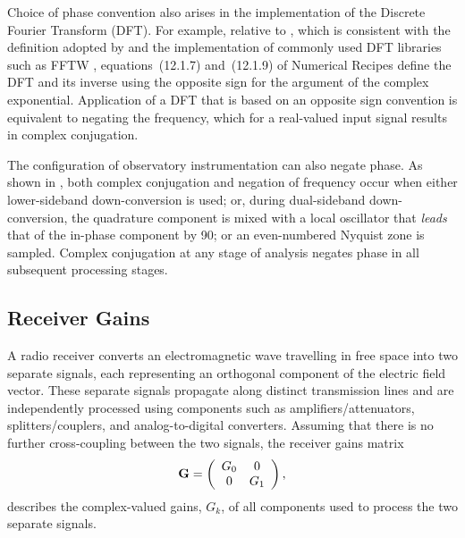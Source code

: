 Choice of phase convention also arises in the implementation of the Discrete Fourier Transform (DFT).
%
For example, relative to , which is consistent with the definition adopted by \citet{bra65} and the implementation of commonly used DFT libraries such as FFTW \citep{fj05},
%
equations~(12.1.7) and~(12.1.9) of Numerical Recipes \citep{pftv86} define the DFT and its inverse using the opposite sign for the argument of the complex exponential.
%
Application of a DFT that is based on an opposite sign convention is equivalent to negating the frequency, which for a real-valued input signal results in complex conjugation.

The configuration of observatory instrumentation can also negate phase.  
As shown in , both complex conjugation and 
negation of frequency occur when either
  lower-sideband down-conversion is used; or,
  during dual-sideband down-conversion, the quadrature component is mixed with a local oscillator that \emph{leads} that of the in-phase component by 90\deg; or
  an even-numbered Nyquist zone is sampled.
%
Complex conjugation at any stage of analysis negates phase in all subsequent processing stages.


\subsection{Receiver Gains}
\label{sec:gain}

A radio receiver converts an electromagnetic wave travelling in free space into two separate signals, each representing an orthogonal component of the electric field vector. These separate signals  propagate along distinct transmission lines and
are independently processed using components such as amplifiers/attenuators, splitters/couplers, and analog-to-digital converters. 
%
Assuming that there is no further cross-coupling between the two signals, the receiver gains matrix
%
\begin{equation}
\label{eqn:receiver_gains}
    {\bf G} =
    \left( \begin{array}{cc}
		G_0 & 0 \\
		0   & G_1
	\end{array} \right),
\end{equation}
%
describes the complex-valued gains, $G_k$, of all components used to process the two separate signals.

